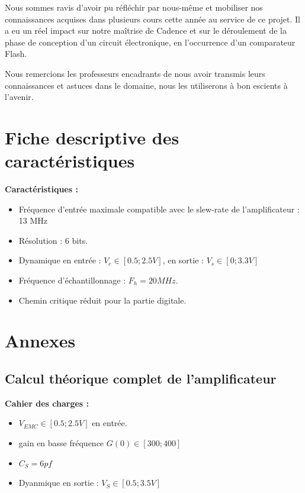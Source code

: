 \documentclass[11pt]{article}
\begin{document}
Nous sommes ravis d'avoir pu r\'efl\'echir par nous-m\^eme et mobiliser nos connaissances acquises dans plusieurs cours cette ann\'ee au service
de ce projet. Il a eu un r\'eel impact sur notre maîtrise de Cadence et sur le d\'eroulement de la phase de conception d'un circuit \'electronique,
en l'occurrence d'un comparateur Flash.

Nous remercions les professeurs encadrants de nous avoir transmis leurs connaissances et astuces dans le domaine, nous les utiliserons
\`a bon escients \`a l'avenir.

\clearpage

\section{Fiche descriptive des caract\'eristiques}

\textbf{Caract\'eristiques :}
\begin{itemize} \itemsep -2pt
\item Fr\'equence d'entr\'ee maximale compatible avec le slew-rate de l'amplificateur : 13 MHz
\item R\'esolution : 6 bits.
\item Dynamique en entr\'ee : $V_e \in [0.5 ; 2.5 V]$, en sortie : $V_s \in [0; 3.3V]$
\item Fr\'equence d'\'echantillonnage : $F_h = 20 MHz$.
\item Chemin critique r\'eduit pour la partie digitale.
\end{itemize}


\clearpage

\section{Annexes}
\subsection{Calcul th\'eorique complet de l'amplificateur}\label{Annexe1}

\textbf{Cahier des charges :} 
\begin{itemize}\itemsep -4pt
\item $V_{EMC} \in [0.5; 2.5V]$ en entr\'ee.
\item gain en basse fr\'equence $G(0) \in [300;400]$
\item $C_{S} = 6 pf$
\item Dyanmique en sortie : $V_{S} \in [0.5; 3.5V]$ 
\end{itemize}
\end{document}
